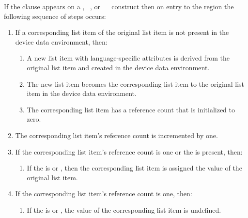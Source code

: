 {{{{If the  clause appears on a , ~, or ~~ construct then on entry to the region the following sequence of steps occurs:
\begin{enumerate}
\item If a corresponding list item of the original list item is not present in the device data environment, then:
\begin{enumerate}
\item A new list item with language-specific attributes is derived from the original list item and created in the device data environment.
\item The new list item becomes the corresponding list item to the original list item in the device data environment.
\item The corresponding list item has a reference count that is initialized to zero. 
\end{enumerate}
\item The corresponding list item's reference count is incremented by one.
\item If the corresponding list item's reference count is one or the   is present, then:
\begin{enumerate}
\item If the  is  or , then the corresponding list item is assigned the value of the original list item. 
\end{enumerate}
\item If the corresponding list item's reference count is one, then:
\begin{enumerate}
\item If the  is  or , the value of the corresponding list item is undefined. 
\end{enumerate}
\end{enumerate}

}}}}
